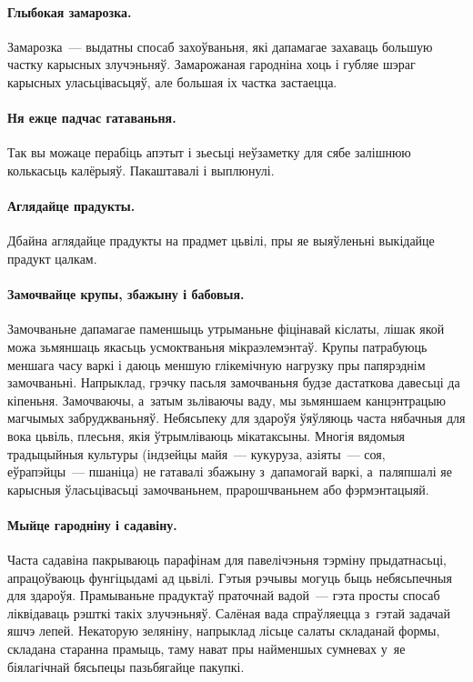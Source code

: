 \paragraph{Глыбокая замарозка.}
Замарозка~--- выдатны спосаб захоўваньня, які дапамагае захаваць большую частку карысных злучэньняў. Замарожаная гародніна хоць і губляе шэраг карысных уласьцівасьцяў, але большая іх частка застаецца.

\paragraph{Ня ежце падчас гатаваньня.}
Так вы можаце перабіць апэтыт і зьесьці неўзаметку для сябе залішнюю колькасьць калёрыяў. Пакаштавалі і выплюнулі.

\paragraph{Аглядайце прадукты.}
Дбайна аглядайце прадукты на прадмет цьвілі, пры яе выяўленьні выкідайце прадукт цалкам.

\paragraph{Замочвайце крупы, збажыну і бабовыя.}
Замочваньне дапамагае паменшыць утрыманьне фіцінавай кіслаты, лішак якой можа зьмяншаць якасьць усмоктваньня мікраэлемэнтаў. Крупы патрабуюць меншага часу варкі і даюць меншую глікемічную нагрузку пры папярэднім замочваньні. Напрыклад, грэчку пасьля замочваньня будзе дастаткова давесьці да кіпеньня. Замочваючы, а~затым зьліваючы ваду, мы зьмяншаем канцэнтрацыю магчымых забруджваньняў. Небясьпеку для здароўя ўяўляюць часта нябачныя для вока цьвіль, плесьня, якія ўтрымліваюць мікатаксыны. Многія вядомыя традыцыйныя культуры (індзейцы майя~--- кукуруза, азіяты~--- соя, еўрапэйцы~--- пшаніца) не гатавалі збажыну з~дапамогай варкі, а~паляпшалі яе карысныя ўласьцівасьці замочваньнем, прарошчваньнем або фэрмэнтацыяй.

\paragraph{Мыйце гародніну і садавіну.}
Часта садавіна пакрываюць парафінам для павелічэньня тэрміну прыдатнасьці, апрацоўваюць фунгіцыдамі ад цьвілі. Гэтыя рэчывы могуць быць небясьпечныя для здароўя. Прамываньне прадуктаў праточнай вадой~--- гэта просты спосаб ліквідаваць рэшткі такіх злучэньняў. Салёная вада спраўляецца з~гэтай задачай яшчэ лепей. Некаторую зеляніну, напрыклад лісьце салаты складанай формы, складана старанна прамыць, таму нават пры найменшых сумневах у~яе біялагічнай бясьпецы пазьбягайце пакупкі.

